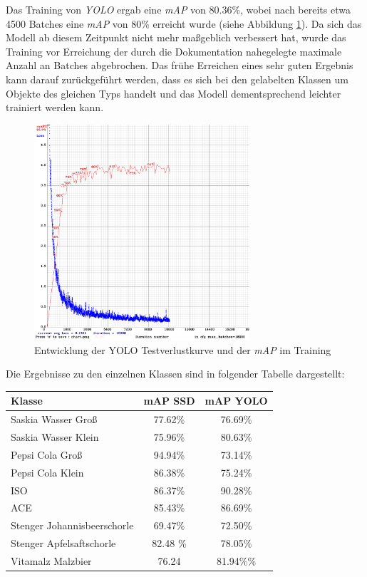 Das Training von \textit{YOLO} ergab eine \textit{mAP} von 80.36\%, wobei nach bereits etwa 4500 Batches eine \textit{mAP} von 80\% erreicht wurde (siehe Abbildung \ref{yolo_result}). Da sich das Modell ab diesem Zeitpunkt nicht mehr maßgeblich verbessert hat, wurde das Training vor Erreichung der durch die Dokumentation nahegelegte maximale Anzahl an Batches abgebrochen. Das frühe Erreichen eines sehr guten Ergebnis kann darauf zurückgeführt werden, dass es sich bei den gelabelten Klassen um Objekte des gleichen Typs handelt und das Modell dementsprechend leichter trainiert werden kann. 

\begin{figure}[H]
	\begin{center}
		\includegraphics[width=8cm]{Bilder/yolo_result.png} 
		\caption{Entwicklung der YOLO Testverlustkurve und der \textit{mAP} im Training}
		\label{yolo_result}
	\end{center}
\end{figure}

Die Ergebnisse zu den einzelnen Klassen sind in folgender Tabelle dargestellt:

\begin{center}
	\begin{tabular}[H]{l|c|c}
		Klasse & mAP SSD & mAP YOLO \\
		\hline
		Saskia Wasser Groß & 77.62\% & 76.69\% \\
		Saskia Wasser Klein & 75.96\% & 80.63\% \\
		Pepsi Cola Groß & 94.94\% & 73.14\% \\
		Pepsi Cola Klein & 86.38\% & 75.24\% \\
		ISO & 86.37\% & 90.28\% \\
		ACE & 85.43\% & 86.69\% \\
		Stenger Johannisbeerschorle & 69.47\% & 72.50\% \\
		Stenger Apfelsaftschorle & 82.48 \% & 78.05\% \\
		Vitamalz Malzbier & 76.24 & 81.94\%\%
	\end{tabular}
	\label{table:ssdyoloresults}
\end{center}

